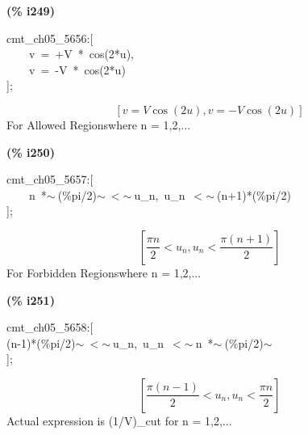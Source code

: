 \documentclass[fleqn]{article}
\begin{document}
\noindent
\begin{minipage}[t]{4.000000em}\color{red}\bfseries
(\% i249)	
\end{minipage}
\begin{minipage}[t]{\textwidth}\color{blue}
cmt\_ch05\_5656:[\\
\ \ \ \ v\ =\ +V\ *\ cos(2*u),\\
\ \ \ \ v\ =\ -V\ *\ cos(2*u)\\
];
\end{minipage}
\[\displaystyle \tag{\% o249} 
\left[ v=V \cos{\left( 2 u\right) }\operatorname{,}v=-V \cos{\left( 2 u\right) }\right] \mbox{}
\]
For Allowed Regionswhere n = 1,2,...


\noindent
\begin{minipage}[t]{4.000000em}\color{red}\bfseries
(\% i250)	
\end{minipage}
\begin{minipage}[t]{\textwidth}\color{blue}
cmt\_ch05\_5657:[\\
\ \ \ \ n\ *\ensuremath{\sim\ }(\%pi/2)\ensuremath{\sim\ }\ensuremath{<}\ensuremath{\sim\ }u\_n,\ u\_n\ \ensuremath{<}\ensuremath{\sim\ }(n+1)*(\%pi/2)\\
];
\end{minipage}
\[\displaystyle \tag{\% o250} 
\left[ \frac{\ensuremath{\pi}  n}{2}\operatorname{<  }{u_n}\operatorname{,}{u_n}\operatorname{<  }\frac{\ensuremath{\pi}  \left( n+1\right) }{2}\right] \mbox{}
\]
For Forbidden Regionswhere n = 1,2,...


\noindent
\begin{minipage}[t]{4.000000em}\color{red}\bfseries
(\% i251)	
\end{minipage}
\begin{minipage}[t]{\textwidth}\color{blue}
cmt\_ch05\_5658:[\\
(n-1)*(\%pi/2)\ensuremath{\sim\ }\ensuremath{<}\ensuremath{\sim\ }u\_n,\ u\_n\ \ensuremath{<}\ensuremath{\sim\ }n\ *\ensuremath{\sim\ }(\%pi/2)\ensuremath{\sim\ }\\
];
\end{minipage}
\[\displaystyle \tag{\% o251} 
\left[ \frac{\ensuremath{\pi}  \left( n-1\right) }{2}\operatorname{<  }{u_n}\operatorname{,}{u_n}\operatorname{<  }\frac{\ensuremath{\pi}  n}{2}\right] \mbox{}
\]
Actual expression is (1/V)\_cut for n = 1,2,...
\end{document}
